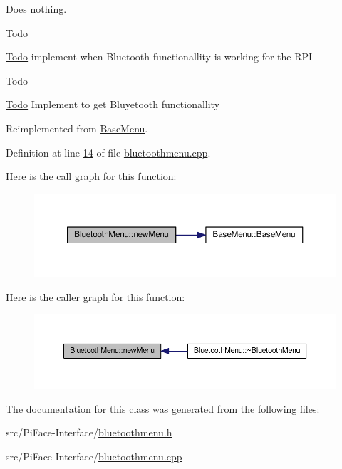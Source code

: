 Does nothing. 

\begin{DoxyRefDesc}{Todo}
\item[\hyperlink{todo__todo000021}{Todo}]implement when Bluetooth functionallity is working for the R\+PI \end{DoxyRefDesc}


\begin{DoxyRefDesc}{Todo}
\item[\hyperlink{todo__todo000020}{Todo}]Implement to get Bluyetooth functionallity \end{DoxyRefDesc}


Reimplemented from \hyperlink{classBaseMenu_a722bb88987e9a64015c59f3419d89704}{Base\+Menu}.



Definition at line \hyperlink{bluetoothmenu_8cpp_source_l00014}{14} of file \hyperlink{bluetoothmenu_8cpp_source}{bluetoothmenu.\+cpp}.



Here is the call graph for this function\+:\nopagebreak
\begin{figure}[H]
\begin{center}
\leavevmode
\includegraphics[width=350pt]{classBluetoothMenu_a0fd16ad5a39ce3624613ad7834a55565_cgraph}
\end{center}
\end{figure}




Here is the caller graph for this function\+:\nopagebreak
\begin{figure}[H]
\begin{center}
\leavevmode
\includegraphics[width=350pt]{classBluetoothMenu_a0fd16ad5a39ce3624613ad7834a55565_icgraph}
\end{center}
\end{figure}




The documentation for this class was generated from the following files\+:\begin{DoxyCompactItemize}
\item 
src/\+Pi\+Face-\/\+Interface/\hyperlink{bluetoothmenu_8h}{bluetoothmenu.\+h}\item 
src/\+Pi\+Face-\/\+Interface/\hyperlink{bluetoothmenu_8cpp}{bluetoothmenu.\+cpp}\end{DoxyCompactItemize}
